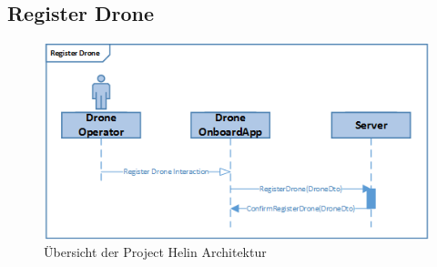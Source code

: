 \subsection{Register Drone}
\begin{figure}[h]
	\centering
	\includegraphics[scale=1.0]{images/registerDrone.png}
	\caption{Übersicht der Project Helin Architektur }
	\label{fig:registerDrone}
\end{figure}
%
